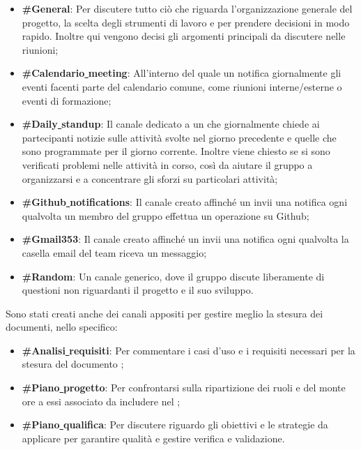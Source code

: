 \documentclass[NormeDiProgetto.tex]{subfiles}
\begin{document}
	\begin{itemize}
		\item \textbf{\#General}: Per discutere tutto ciò che riguarda l'organizzazione generale del progetto, la scelta degli strumenti di lavoro e per prendere decisioni in modo rapido. Inoltre qui vengono decisi gli argomenti principali da discutere nelle riunioni;
		\item \textbf{\#Calendario\underline{ }meeting}: All'interno del quale un  notifica giornalmente gli eventi facenti parte del calendario comune, come riunioni interne/esterne o eventi di formazione;
		\item \textbf{\#Daily\underline{ }standup}: Il canale dedicato a un  che giornalmente chiede ai partecipanti notizie sulle attività svolte nel giorno precedente e quelle che sono programmate per il giorno corrente. Inoltre viene chiesto se si sono verificati problemi nelle attività in corso, così da aiutare il gruppo a organizzarsi e a concentrare gli sforzi su particolari attività;
		\item \textbf{\#Github\underline{ }notifications}: Il canale creato affinché un  invii una notifica ogni qualvolta un membro del gruppo effettua un operazione su Github;
		\item \textbf{\#Gmail353}: Il canale creato affinché un  invii una notifica ogni qualvolta la casella email del team riceva un messaggio;
		\item \textbf{\#Random}: Un canale generico, dove il gruppo discute liberamente di questioni non riguardanti il progetto e il suo sviluppo.	
	\end{itemize}

	Sono stati creati anche dei canali appositi per gestire meglio la stesura dei documenti, nello specifico:
	\begin{itemize}
		\item \textbf{\#Analisi\underline{ }requisiti}: Per commentare i casi d'uso e i requisiti necessari per la stesura del documento \adr;
		\item \textbf{\#Piano\underline{ }progetto}: Per confrontarsi sulla ripartizione dei ruoli e del monte ore a essi associato da includere nel \pdp;
		\item \textbf{\#Piano\underline{ }qualifica}: Per discutere riguardo gli obiettivi e le strategie da applicare per garantire qualità e gestire verifica e validazione.
	\end{itemize}
	
\end{document}
